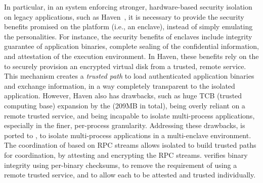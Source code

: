 

In particular, in an system enforcing stronger, hardware-based security isolation
on legacy applications,
such as Haven~\citep{baumann14haven},
it is necessary
to provide the security benefits promised on the platform
(i.e., an \intel{} \sgx{} enclave),
instead of simply emulating the personalities.
For instance,
the security benefits of enclaves
include integrity guarantee of application binaries,
complete sealing of the confidential information, and attestation of the execution environment.
In Haven, these benefits rely on
the \libos{} to securely provision an encrypted virtual disk
from a trusted, remote service.
This mechanism creates a \emph{trusted path} to
load authenticated application binaries
and exchange information,
in a way completely transparent to the isolated application.
However, Haven{} also has drawbacks, such as huge TCB (trusted computing base)
expansion by the \libos{} (209MB in total),
being overly reliant on a remote trusted service,
and being incapable to isolate multi-process applications,
especially in the finer, per-process granularity.
Addressing these drawbacks,
\graphene{} is ported to \intel{} \sgx{},
to isolate multi-process applications in a multi-enclave environment.
The coordination of \graphene{} based on RPC streams
allows isolated \picoprocs{} to build trusted paths for coordination,
by attesting and encrypting the RPC streams.
\graphene{} verifies binary integrity using per-binary checksums,
to remove the requirement of using a remote trusted service,
and to allow each \picoproc{} to be attested and trusted individually.




